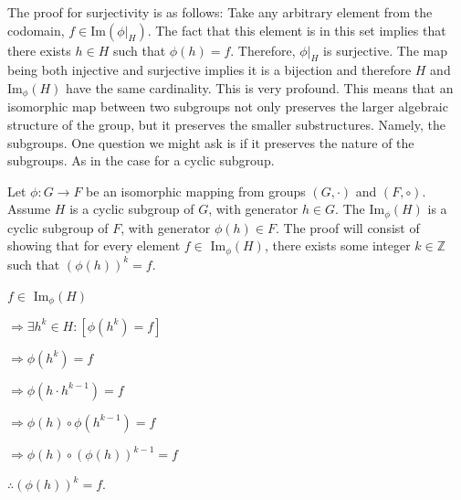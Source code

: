 \documentclass[12pt, a4paper]{article}
\begin{document}
\vspace{4mm}

    The proof for surjectivity is as follows: Take any arbitrary element from the codomain, $f\in$Im$(\phi|_H)$. The fact that this element is in this set implies that there exists $h\in H$ such that $\phi(h)=f$. Therefore, $\phi|_H$ is surjective. The map being both injective and surjective implies it is a bijection and therefore $H$ and Im$_{\phi}(H)$ have the same cardinality. This is very profound. This means that an isomorphic map between two subgroups not only preserves the larger algebraic structure of the group, but it preserves the smaller substructures. Namely, the subgroups. One question we might ask is if it preserves the nature of the subgroups. As in the case for a cyclic subgroup.\par
    
\newpage

    Let $\phi\colon G\rightarrow F$ be an isomorphic mapping from groups $(G,\cdot)$ and $(F,\circ)$. Assume $H$ is a cyclic subgroup of $G$, with generator $h\in G$. The Im$_{\phi}(H)$ is a cyclic subgroup of $F$, with generator $\phi(h)\in F$. The proof will consist of showing that for every element\hspace{8mm} $f\in$ Im$_{\phi}(H)$, there exists some integer $k\in\mathbb{Z}$ such that $(\phi(h))^k=f$.\par
    
\vspace{4mm}

\hspace{2mm} $f\in$ Im$_{\phi}(H)$\par
\vspace{2mm}
\hspace{10mm} $\Rightarrow\exists h^k\in H\colon[\phi(h^k)=f]$\par
\vspace{2mm}
\hspace{10mm} $\Rightarrow\phi(h^k)=f$\par
\vspace{2mm}
\hspace{10mm} $\Rightarrow\phi(h\cdot h^{k-1})=f$\par
\vspace{2mm}
\hspace{10mm} $\Rightarrow\phi(h)\circ\phi(h^{k-1})=f$\par
\vspace{2mm}
\hspace{10mm} $\Rightarrow\phi(h)\circ(\phi(h))^{k-1}=f$\par
\vspace{2mm}
\hspace{2mm} $\therefore(\phi(h))^k=f$.\par
\vspace{4mm}
\end{document}
